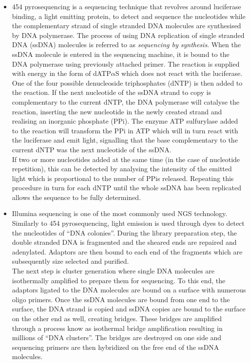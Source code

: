 \begin{itemize}
	
	\item 454 pyrosequencing \citep{margulies05} is a sequencing technique that revolves around luciferase binding, a light emitting protein, to detect and sequence the nucleotides while the complementary strand of single stranded DNA molecules are synthesised by DNA polymerase. The process of using DNA replication of single stranded DNA (ssDNA) molecules is referred to as \emph{sequencing by synthesis}. When the ssDNA molecule is entered in the sequencing machine, it is bound to the DNA polymerase using previously attached primer. The reaction is supplied with energy in the form of dATP$\alpha$S which does not react with the luciferase.\\
	
	One of the four possible denucleoside triphosphates (dNTP) is then added to the reaction. If the next nucleotide of the ssDNA strand to copy is complementary to the current dNTP, the DNA polymerase will catalyse the reaction, inserting the new nucleotide in the newly created strand and realising an inorganic phosphate (PPi). The enzyme ATP sulfurylase added to the reaction will transform the PPi in ATP which will in turn react with the luciferase and emit light, signalling that the base complementary to the current dNTP was the next nucleotide of the ssDNA.\\
	
	If two or more nucleotides added at the same time (in the case of nucleotide repetition), this can be detected by analysing the intensity of the emitted light which is proportional to the number of PPis released. Repeating this procedure in turn for each dNTP until the whole ssDNA has been replicated allows the sequence to be fully determined.
	
	\item Illumina sequencing \citep{bentley08} is one of the most commonly used NGS technology. Similarly to 454 pyrosequencing, light emission is used through dyes to detect the nucleotides of ``DNA colonies''. During the library preparation step, the double stranded DNA is fragmented and the sheared ends are repaired and adenylated. Adaptors are then bound to each end of the fragments which are subsequently size selected and purified.\\
	
	 The next step is cluster generation where single DNA molecules are isothermally amplified to prepare them for sequencing. To this end, the adaptors ligated to the DNA molecules are bound on a surface with numerous oligo primers. Once the ssDNA molecules are bound from one end to the surface, the DNA strand is copied and ssDNA copies are bound to the surface on the other end as well, creating bridges. These bridges are amplified through a process know as isothermal bridge amplification resulting in millions of ``DNA clusters''. The bridges are destroyed on one side and sequencing primers are then hybridized on the free end of the ssDNA molecules.\\
	 

\end{itemize}
